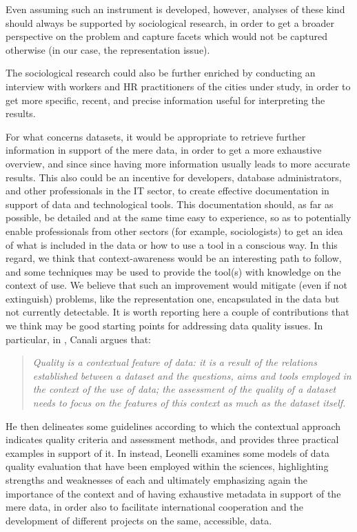 Even assuming such an instrument is developed, however, analyses of these kind should always be supported by sociological research, in order to get a broader perspective on the problem and capture facets which would not be captured otherwise (in our case, the representation issue).

The sociological research could also be further enriched by conducting an interview with workers and HR practitioners of the cities under study, in order to get more specific, recent, and precise information useful for interpreting the results.

For what concerns datasets, it would be appropriate to retrieve further information in support of the mere data, in order to get a more exhaustive overview, and since since having more information usually leads to more accurate results. This also could be an incentive for developers, database administrators, and other professionals in the IT sector, to create effective documentation in support of data and technological tools. This documentation should, as far as possible, be detailed and at the same time easy to experience, so as to potentially enable professionals from other sectors (for example, sociologists) to get an idea of what is included in the data or how to use a tool in a conscious way. In this regard, we think that context-awareness would be an interesting path to follow, and some techniques may be used to provide the tool(s) with knowledge on the context of use. We believe that such an improvement would mitigate (even if not extinguish) problems, like the representation one, encapsulated in the data but not currently detectable. It is worth reporting here a couple of contributions that we think may be good starting points for addressing data quality issues. In particular, in \cite{canali2020towards}, Canali argues that:
\begin{quote}\emph{Quality is a contextual feature of data: it is a result of the relations established between a dataset and the questions, aims and tools employed in the context of the use of data; the assessment of the quality of a dataset needs to focus on the features of this context as much as the dataset itself.} \cite[p.~4]{canali2020towards}\end{quote}
He then delineates some guidelines according to which the contextual approach indicates quality criteria and assessment methods, and provides three practical examples in support of it. In \cite{leonelli2017global} instead, Leonelli examines some models of data quality evaluation that have been employed within the sciences, highlighting strengths and weaknesses of each and ultimately emphasizing again the importance of the context and of having exhaustive metadata in support of the mere data, in order also to facilitate international cooperation and the development of different projects on the same, accessible, data.
